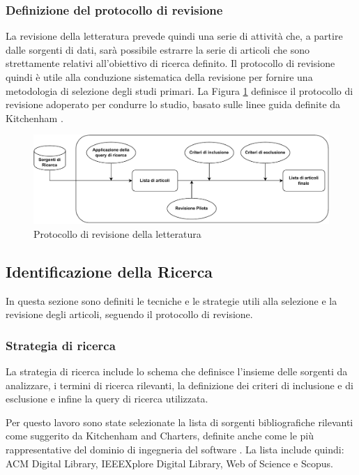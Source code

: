 \subsubsection{Definizione del protocollo di revisione}
La revisione della letteratura prevede quindi una serie di attività che, a partire dalle sorgenti di dati, sarà possibile estrarre la serie di articoli che sono strettamente relativi all'obiettivo di ricerca definito.
Il protocollo di revisione quindi è utile alla conduzione sistematica della revisione per fornire una metodologia di selezione degli studi primari. La Figura \ref{fig:slr_process} definisce il protocollo di revisione adoperato per condurre lo studio, basato sulle linee guida definite da Kitchenham \cite{kitchenhamSLR}.
\begin{figure}
    \centering
    \includegraphics[width=1\textwidth]{Figure/Design/review_process.pdf}
    \caption{Protocollo di revisione della letteratura}
    \label{fig:slr_process}
\end{figure}
\subsection{Identificazione della Ricerca}
In questa sezione sono definiti le tecniche e le strategie utili alla selezione e la revisione degli articoli, seguendo il protocollo di revisione.
\subsubsection{Strategia di ricerca}
La strategia di ricerca include lo schema che definisce l'insieme delle sorgenti da analizzare, i termini di ricerca rilevanti, la definizione dei criteri di inclusione e di esclusione e infine la query di ricerca utilizzata.

Per questo lavoro sono state selezionate la lista di sorgenti bibliografiche rilevanti come suggerito da Kitchenham and Charters, definite anche come le più rappresentative del dominio di ingegneria del software \cite{Kitchenham2007}.
La lista include quindi: ACM Digital Library, IEEEXplore Digital Library, Web of Science e Scopus.

